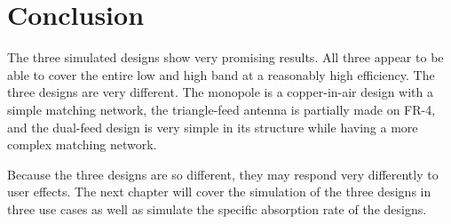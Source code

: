 \section{Conclusion}
The three simulated designs show very promising results. All three appear to be able to cover the entire low and high band at a reasonably high efficiency. The three designs are very different. The monopole is a copper-in-air design with a simple matching network, the triangle-feed antenna is partially made on FR-4, and the dual-feed design is very simple in its structure while having a more complex matching network.

Because the three designs are so different, they may respond very differently to user effects. The next chapter will cover the simulation of the three designs in three use cases as well as simulate the specific absorption rate of the designs.
